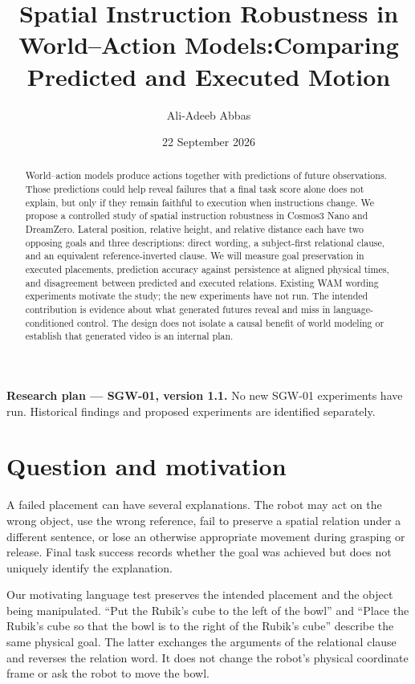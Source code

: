 \documentclass[11pt]{article}
\title{Spatial Instruction Robustness in World--Action Models:\newline Comparing Predicted and Executed Motion}
\author{Ali-Adeeb Abbas}
\date{22 September 2026}
\newcommand{\status}{\textbf{Research plan --- SGW-01, version 1.1.} No new SGW-01 experiments have run. Historical findings and proposed experiments are identified separately.}
\begin{document}
\maketitle
\begin{center}\small\color{ink}\status\end{center}

\begin{abstract}
World--action models produce actions together with predictions of future observations. Those predictions could help reveal failures that a final task score alone does not explain, but only if they remain faithful to execution when instructions change. We propose a controlled study of spatial instruction robustness in Cosmos3 Nano and DreamZero. Lateral position, relative height, and relative distance each have two opposing goals and three descriptions: direct wording, a subject-first relational clause, and an equivalent reference-inverted clause. We will measure goal preservation in executed placements, prediction accuracy against persistence at aligned physical times, and disagreement between predicted and executed relations. Existing WAM wording experiments motivate the study; the new experiments have not run. The intended contribution is evidence about what generated futures reveal and miss in language-conditioned control. The design does not isolate a causal benefit of world modeling or establish that generated video is an internal plan.
\end{abstract}

\section{Question and motivation}
A failed placement can have several explanations. The robot may act on the wrong object, use the wrong reference, fail to preserve a spatial relation under a different sentence, or lose an otherwise appropriate movement during grasping or release. Final task success records whether the goal was achieved but does not uniquely identify the explanation.

Our motivating language test preserves the intended placement and the object being manipulated. ``Put the Rubik's cube to the left of the bowl'' and ``Place the Rubik's cube so that the bowl is to the right of the Rubik's cube'' describe the same physical goal. The latter exchanges the arguments of the relational clause and reverses the relation word. It does not change the robot's physical coordinate frame or ask the robot to move the bowl.
\end{document}
